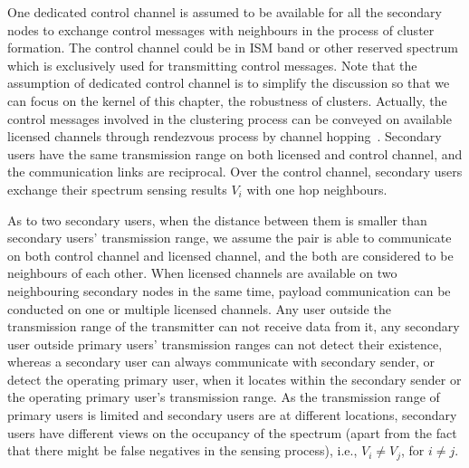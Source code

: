 One dedicated control channel is assumed to be available for all the secondary nodes to exchange control messages with neighbours in the process of cluster formation.
The control channel could be in ISM band or other reserved spectrum which is exclusively used for transmitting control messages.
Note that the assumption of dedicated control channel is to simplify the discussion so that we can focus on the kernel of this chapter, the robustness of clusters.
Actually, the control messages involved in the clustering process can be conveyed on available licensed channels through rendezvous process by channel hopping~\cite{channelHopping_Rendezvous_2014, Gu_distributed_rendezvous_2014}. 
Secondary users have the same transmission range on both licensed and control channel, and the communication links are reciprocal.
Over the control channel, secondary users exchange their spectrum sensing results $V_{i}$ with one hop neighbours. 

As to two secondary users, when the distance between them is smaller than secondary users' transmission range, we assume the pair is able to communicate on both control channel and licensed channel, and the both are considered to be neighbours of each other.
When licensed channels are available on two neighbouring secondary nodes in the same time, payload communication can be conducted on one or multiple licensed channels.
Any user outside the transmission range of the transmitter can not receive data from it, \ie  any secondary user outside primary users' transmission ranges can not detect their existence, whereas a secondary user can always communicate with secondary sender, or detect the operating primary user, when it locates within the secondary sender or the operating primary user's transmission range.
As the transmission range of primary users is limited and secondary users are at different locations, secondary users have different views on the occupancy of the spectrum (apart from the fact that there might be false negatives in the sensing process), i.e., $V_i \neq V_j$, for $i \neq j$.

